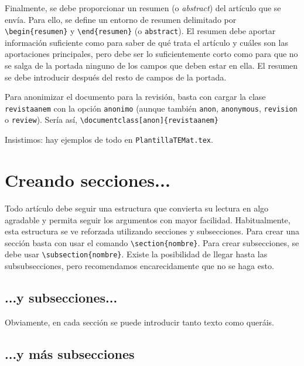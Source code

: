 \documentclass[%
extracommands,%
]{revistaanem}
\begin{document}
Finalmente, se debe proporcionar un resumen (o \textit{abstract}) del artículo que se envía.
Para ello, se define un entorno de resumen delimitado por \verb+\begin{resumen}+ y \verb+\end{resumen}+ (o \verb+abstract+).
El resumen debe aportar información suficiente como para saber de qué trata el artículo y cuáles son las aportaciones principales, pero debe ser lo suficientemente corto como para que no se salga de la portada ninguno de los campos que deben estar en ella.
El resumen se debe introducir después del resto de campos de la portada.

Para anonimizar el documento para la revisión, basta con cargar la clase \verb+revistaanem+ con la opción \verb+anonimo+ (aunque también \verb+anon+, \verb+anonymous+, \verb+revision+ o \verb+review+).
Sería así, \verb+\documentclass[anon]{revistaanem}+

Insistimos: hay ejemplos de todo en \verb+PlantillaTEMat.tex+.



\section{Creando secciones...}

Todo artículo debe seguir una estructura que convierta su lectura en algo agradable y permita seguir los argumentos con mayor facilidad.
Habitualmente, esta estructura se ve reforzada utilizando secciones y subsecciones.
Para crear una sección basta con usar el comando \verb+\section{nombre}+.
Para crear subsecciones, se debe usar \verb+\subsection{nombre}+.
Existe la posibilidad de llegar hasta las subsubsecciones, pero recomendamos encarecidamente que no se haga esto.

\subsection{...y subsecciones...}

Obviamente, en cada sección se puede introducir tanto texto como queráis.

\subsection{...y más subsecciones}
\end{document}
